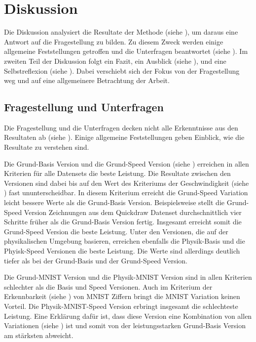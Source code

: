 \chapter{Diskussion}\label{chap:d}
Die Diskussion analysiert die Resultate der Methode (siehe ),
um daraus eine Antwort auf die Fragestellung zu bilden. Zu diesem Zweck werden
einige allgemeine Feststellungen getroffen und die Unterfragen beantwortet
(siehe ). Im zweiten Teil der Diskussion folgt ein Fazit,
ein Ausblick (siehe ), und eine Selbstreflexion (siehe
). Dabei verschiebt sich der Fokus von der Fragestellung
weg und auf eine allgemeinere Betrachtung der Arbeit.
 
 
\section{Fragestellung und Unterfragen}\label{chap:d_frage}
Die Fragestellung und die Unterfragen decken nicht alle Erkenntnisse aus den
Resultaten ab (siehe ). Einige allgemeine Feststellungen geben
Einblick, wie die Resultate zu verstehen sind.
 
Die Grund-Basis Version und die Grund-Speed Version (siehe
) erreichen in allen Kriterien für alle Datensets die
beste Leistung. Die Resultate zwischen den Versionen sind dabei bis auf den Wert
des Kriteriums der Geschwindigkeit (siehe ) fast
ununterscheidbar. In diesem Kriterium erreicht die Grund-Speed Variation leicht
bessere Werte als die Grund-Basis Version. Beispielsweise stellt die Grund-Speed
Version Zeichnungen aus dem Quickdraw Datenset durchschnittlich vier Schritte
früher als die Grund-Basis Version fertig. Insgesamt erreicht somit die
Grund-Speed Version die beste Leistung. Unter den Versionen, die auf der
physikalischen Umgebung basieren, erreichen ebenfalls die Physik-Basis und die
Phyisk-Speed Versionen die beste Leistung. Die Werte sind allerdings deutlich
tiefer als bei der Grund-Basis und der Grund-Speed Version.
 
Die Grund-MNIST Version und die Physik-MNIST Version sind in allen Kriterien
schlechter als die Basis und Speed Versionen. Auch im Kriterium der
Erkennbarkeit (siehe ) von MNIST Ziffern bringt die
MNIST Variation keinen Vorteil. Die Physik-MNIST-Speed Version erbringt
insgesamt die schlechteste Leistung. Eine Erklärung dafür ist, dass diese
Version eine Kombination von allen Variationen (siehe )
ist und somit von der leistungsstarken Grund-Basis Version am stärksten
abweicht.
 
